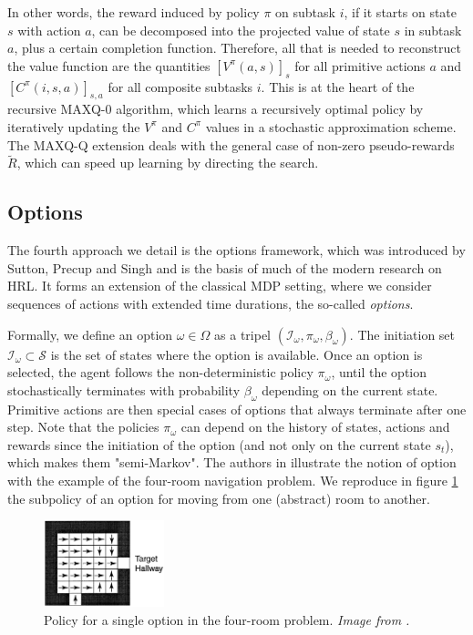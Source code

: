 \documentclass{article}
\begin{document}
In other words, the reward induced by policy $\pi$ on subtask $i$, if it starts on state $s$ with action $a$, can be decomposed into the projected value of state $s$ in subtask $a$, plus a certain completion function.
Therefore, all that is needed to reconstruct the value function are the quantities $[V^{\pi}(a, s)]_s$ for all primitive actions $a$ and $[C^{\pi}(i, s, a)]_{s, a}$ for all composite subtasks $i$. This is at the heart of the recursive MAXQ-0 algorithm, which learns a recursively optimal policy by iteratively updating the $V^{\pi}$ and $C^{\pi}$ values in a stochastic approximation scheme. The MAXQ-Q extension deals with the general case of non-zero pseudo-rewards $\tilde{R}$, which can speed up learning by directing the search.

\subsection{Options}

The fourth approach we detail is the options framework, which was introduced by Sutton, Precup and Singh \cite{sutton_between_1999} and is the basis of much of the modern research on HRL. It forms an extension of the classical MDP setting, where we consider sequences of actions with extended time durations, the so-called \textit{options}.

Formally, we define an option $\omega \in \Omega$ as a tripel $(\mathcal{I}_\omega, \pi_\omega, \beta_\omega)$. The initiation set $\mathcal{I}_\omega \subset \mathcal{S}$ is the set of states where the option is available. Once an option is selected, the agent follows the non-deterministic policy $\pi_\omega$, until the option stochastically terminates with probability $\beta_\omega$ depending on the current state. Primitive actions are then special cases of options that always terminate after one step. Note that the policies $\pi_\omega$ can  depend on the history of states, actions and rewards since the initiation of the option (and not only on the current state $s_t$), which makes them "semi-Markov". The authors in \cite{sutton_between_1999} illustrate the notion of option with the example of the four-room navigation problem. We reproduce in figure \ref{fig:single-option} the subpolicy of an option for moving from one (abstract) room to another.

\begin{figure}
    \centering
    \includegraphics[width=3.5cm]{images/single_option.png}
    \caption{Policy for a single option in the four-room problem. \small \it Image from \cite{sutton_between_1999}.}
    \label{fig:single-option}
    \vspace{-0.5cm}
\end{figure}
\end{document}
